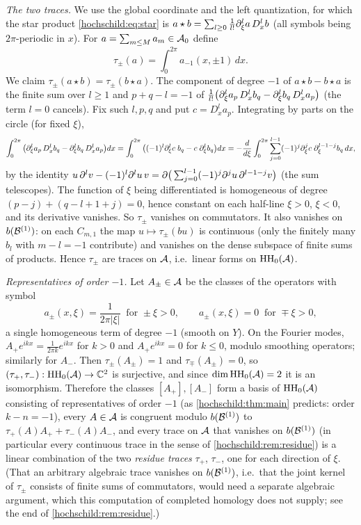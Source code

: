 \emph{The two traces.} We use the global coordinate and the left quantization, for which the star product
\eqref{hochschild:eq:star} is $a\star b=\sum_{l\ge0}\frac1{l!}\partial_\xi^la\,D_x^lb$ (all symbols being $2\pi$-periodic in
$x$). For $a=\sum_{m\le M}a_m\in\mathcal{A}_0$ define
\begin{equation*}
  \tau_\pm(a)=\int_0^{2\pi}a_{-1}(x,\pm1)\,dx .
\end{equation*}
We claim $\tau_\pm(a\star b)=\tau_\pm(b\star a)$. The component of degree $-1$ of $a\star b-b\star a$ is the finite sum
over $l\ge1$ and $p+q-l=-1$ of $\frac1{l!}\big(\partial_\xi^la_p\,D_x^lb_q-\partial_\xi^lb_q\,D_x^la_p\big)$ (the term $l=0$
cancels). Fix such $l,p,q$ and put $c=D_x^la_p$. Integrating by parts on the circle (for fixed $\xi$),
\begin{equation*}
  \int_0^{2\pi}\big(\partial_\xi^la_p\,D_x^lb_q-\partial_\xi^lb_q\,D_x^la_p\big)dx
  =\int_0^{2\pi}\big((-1)^l\partial_\xi^lc\;b_q-c\;\partial_\xi^lb_q\big)dx
  =-\frac{d}{d\xi}\int_0^{2\pi}\sum_{j=0}^{l-1}(-1)^j\partial_\xi^jc\;\partial_\xi^{l-1-j}b_q\,dx,
\end{equation*}
by the identity $u\,\partial^lv-(-1)^l\partial^lu\,v=\partial\big(\sum_{j=0}^{l-1}(-1)^j\partial^ju\,\partial^{l-1-j}v\big)$ (the sum
telescopes). The function of $\xi$ being differentiated is homogeneous of degree $(p-j)+(q-l+1+j)=0$, hence
constant on each half-line $\xi>0$, $\xi<0$, and its derivative vanishes. So $\tau_\pm$ vanishes on
commutators. It also vanishes on $b(\mathcal{B}^{(1)})$: on each $C_{m,1}$ the map $u\mapsto\tau_\pm(bu)$ is continuous
(only the finitely many $b_l$ with $m-l=-1$ contribute) and vanishes on the dense subspace of finite sums of
products. Hence $\tau_\pm$ are traces on $\mathcal{A}$, i.e.\ linear forms on $\operatorname{HH}_0(\mathcal{A})$.

\emph{Representatives of order $-1$.} Let $A_\pm\in\mathcal{A}$ be the classes of the operators with symbol
\begin{equation*}
  a_\pm(x,\xi)=\frac1{2\pi|\xi|}\ \text{ for }\pm\xi>0,\qquad a_\pm(x,\xi)=0\ \text{ for }\mp\xi>0,
\end{equation*}
a single homogeneous term of degree $-1$ (smooth on $Y$). On the Fourier modes, $A_+e^{ikx}=\frac{1}{2\pi k}e^{ikx}$ for
$k>0$ and $A_+e^{ikx}=0$ for $k\le0$, modulo smoothing operators; similarly for $A_-$. Then
$\tau_\pm(A_\pm)=1$ and $\tau_\mp(A_\pm)=0$, so $(\tau_+,\tau_-):\operatorname{HH}_0(\mathcal{A})\to\mathbb{C}^2$ is surjective, and since
$\dim\operatorname{HH}_0(\mathcal{A})=2$ it is an isomorphism. Therefore the classes $[A_+],[A_-]$ form a basis of $\operatorname{HH}_0(\mathcal{A})$ consisting
of representatives of order $-1$ (as \cref{hochschild:thm:main} predicts: order $k-n=-1$), every
$A\in\mathcal{A}$ is congruent modulo $b(\mathcal{B}^{(1)})$ to $\tau_+(A)A_++\tau_-(A)A_-$, and every trace on $\mathcal{A}$ that vanishes on
$b(\mathcal{B}^{(1)})$ (in particular every continuous trace in the sense of \cref{hochschild:rem:residue}) is a linear
combination of the two \emph{residue traces} $\tau_+$, $\tau_-$, one for each direction of $\xi$. (That an arbitrary
algebraic trace vanishes on $b(\mathcal{B}^{(1)})$, i.e.\ that the joint kernel of $\tau_\pm$ consists of finite sums of
commutators, would need a separate algebraic argument, which this computation of completed homology does not supply;
see the end of \cref{hochschild:rem:residue}.)

